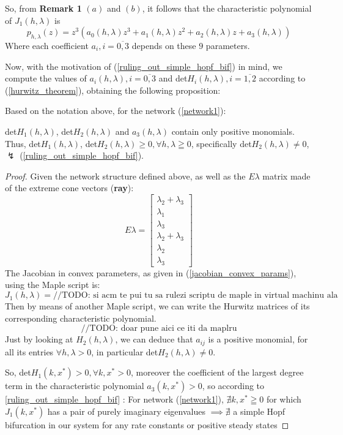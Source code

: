 So, from \textbf{Remark 1} $(a)$ and $(b)$, it follows that the characteristic polynomial of $J_1(h, \lambda)$ is
\[
	p_{h,\lambda}(z) = z^3 (a_0(h,\lambda) z^3 + a_1(h, \lambda)z^2 + a_2 (h,\lambda)z + a_3(h,\lambda) )
\]
Where each coefficient $a_i, i = \overline{0,3}$ depends on these $9$ parameters.

Now, with the motivation of (\ref{ruling_out_simple_hopf_bif}) in mind, we compute the values of $a_i(h,\lambda), i = \overline{0,3}$ and det$H_i(h,\lambda), i = \overline{1,2}$ according to (\ref{hurwitz_theorem}), obtaining the following proposition:
\begin{proposition}
	Based on the notation above, for the network (\ref{network1}):

	det$H_1(h,\lambda)$, det$H_2(h,\lambda)$ and $a_3(h,\lambda)$ contain only positive monomials. Thus, det$H_1(h,\lambda)$, det$H_2(h,\lambda) \geq 0, \forall h, \lambda \geqq 0$, specifically det$H_2(h,\lambda) \neq 0$, $\lightning$ (\ref{ruling_out_simple_hopf_bif}).
\end{proposition}
\begin{proof}
	Given the network structure defined above, as well as the $E\lambda$ matrix made of the extreme cone vectors (\textbf{ray}):
	\[
		E\lambda =
		\begin{bmatrix}
			\lambda_2 + \lambda_3 \\
			\lambda_1 \\
			\lambda_3 \\
			\lambda_2 + \lambda_3 \\
			\lambda_2 \\
			\lambda_3
		\end{bmatrix}
	\]
	The Jacobian in convex parameters, as given in (\ref{jacobian_convex_params}), using the Maple script is:
	\[
		J_1(h,\lambda)=
		\text{//TODO: si acm te pui tu sa rulezi scriptu de maple in virtual machinu ala}
	\]
	Then by means of another Maple script, we can write the Hurwitz matrices of its corresponding characteristic polynomial.
	\[
		\text{//TODO: doar pune aici ce iti da maplru}
	\]
	Just by looking at $H_2(h,\lambda)$, we can deduce that $a_{ij}$ is a positive monomial, for all  its entries $\forall h , \lambda > 0$, in particular det$H_2(h, \lambda) \neq 0$.

	So, det$H_1(k,x^*) > 0, \forall k, x^* > 0$, moreover the coefficient of the largest degree term in the characteristic polynomial $a_3(k, x^*) > 0$, so according to \ref{ruling_out_simple_hopf_bif} : For network (\ref{network1}), $\nexists k, x^* \geqq 0$ for which $J_1(k,x^*)$ has a pair of purely imaginary eigenvalues $\implies \nexists$ a simple Hopf bifurcation in our system for any rate constants or positive steady states
\end{proof}

